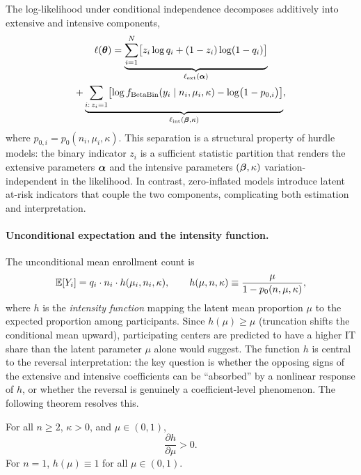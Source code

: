 The log-likelihood under conditional independence decomposes additively into
extensive and intensive components,
\begin{multline}\label{eq:loglik-decomp}
  \ell(\boldsymbol{\theta})
  = \underbrace{\sum_{i=1}^{N}\bigl[z_i\log q_i + (1-z_i)\log(1-q_i)\bigr]}
    _{\ell_{\mathrm{ext}}(\boldsymbol{\alpha})} \\
  + \underbrace{\sum_{i:\,z_i=1}\bigl[\log f_{\operatorname{BetaBin}}(y_i \mid n_i,\mu_i,\kappa)
    - \log\bigl(1 - p_{0,i}\bigr)\bigr]}
    _{\ell_{\mathrm{int}}(\boldsymbol{\beta},\kappa)},
\end{multline}
where $p_{0,i} = p_0(n_i,\mu_i,\kappa)$. This separation is a structural
property of hurdle models: the binary indicator $z_i$ is a sufficient statistic
partition that renders the extensive parameters $\boldsymbol{\alpha}$ and the intensive
parameters $(\boldsymbol{\beta},\kappa)$ variation-independent in the likelihood. In
contrast, zero-inflated models introduce latent at-risk indicators that couple
the two components, complicating both estimation and interpretation.

\paragraph{Unconditional expectation and the intensity function.}
The unconditional mean enrollment count is
\begin{equation}\label{eq:uncond-mean}
  \mathbb{E}[Y_i] = q_i \cdot n_i \cdot h(\mu_i, n_i, \kappa),
  \qquad
  h(\mu, n, \kappa) \equiv \frac{\mu}{1 - p_0(n,\mu,\kappa)},
\end{equation}
where $h$ is the \emph{intensity function} mapping the latent mean proportion
$\mu$ to the expected proportion among participants. Since $h(\mu) \ge \mu$
(truncation shifts the conditional mean upward), participating centers are
predicted to have a higher IT share than the latent parameter $\mu$ alone
would suggest. The function $h$ is central to the reversal
interpretation: the key question is whether the opposing signs of the extensive
and intensive coefficients can be ``absorbed'' by a nonlinear response of $h$,
or whether the reversal is genuinely a coefficient-level phenomenon. The
following theorem resolves this.

\begin{theorem}[Monotonicity of $h$]\label{thm:monotonicity}
  For all $n \ge 2$, $\kappa > 0$, and $\mu \in (0,1)$,
  \begin{equation}\label{eq:dh-dmu}
    \frac{\partial h}{\partial \mu} > 0.
  \end{equation}
  For $n = 1$, $h(\mu) \equiv 1$ for all $\mu \in (0,1)$.
\end{theorem}

